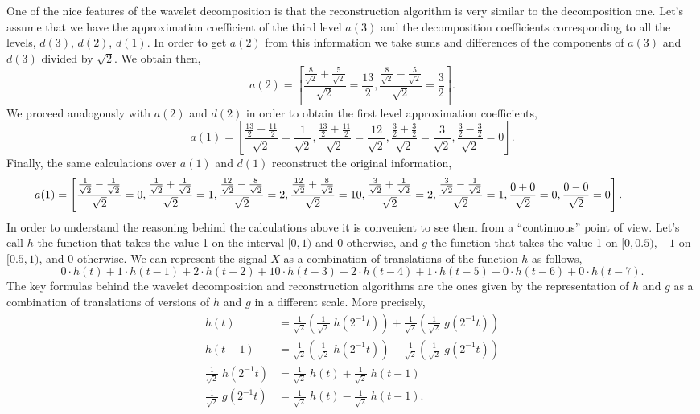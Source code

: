 One of the nice features of the wavelet decomposition is that the reconstruction algorithm is very similar to the decomposition one. Let's assume that we have the approximation coefficient of the third level $a(3)$ and the decomposition coefficients corresponding to all the levels, $d(3)$, $d(2)$, $d(1)$. In order to get $a(2)$ from this information we take sums and differences of the components of $a(3)$ and $d(3)$ divided by $\sqrt{2}$. We obtain then,
	\[
	a(2)= \left[ \dfrac{\frac{8}{\sqrt{2}} + \frac{5}{\sqrt{2}}}{\sqrt{2}}= \dfrac{13}{2}, \dfrac{\frac{8}{\sqrt{2}} - \frac{5}{\sqrt{2}}}{\sqrt{2}} = \dfrac{3}{2} \right].
	\]
We proceed analogously with $a(2)$ and $d(2)$ in order to obtain the first level approximation coefficients,
	\[
	a(1)= \left[ \dfrac{\frac{13}{2} - \frac{11}{2}}{\sqrt{2}} = \dfrac{1}{\sqrt{2}}, \dfrac{\frac{13}{2} + \frac{11}{2}}{\sqrt{2}} = \dfrac{12}{\sqrt{2}}, \dfrac{\frac{3}{2}+\frac{3}{2}}{\sqrt{2}} = \dfrac{3}{\sqrt{2}},\dfrac{\frac{3}{2} - \frac{3}{2}}{\sqrt{2}} = 0 \right].
	\]
Finally, the same calculations over $a(1)$ and $d(1)$ reconstruct the original information,
	\[
	\hspace{-1.5cm} a(1)=\left[\frac{\frac{1}{\sqrt{2}}-\frac{1}{\sqrt{2}}}{\sqrt{2}}=0,\frac{\frac{1}{\sqrt{2}}+\frac{1}{\sqrt{2}}}{\sqrt{2}}=1,\frac{\frac{12}{\sqrt{2}}-\frac{8}{\sqrt{2}}}{\sqrt{2}}=2,\frac{\frac{12}{\sqrt{2}}+\frac{8}{\sqrt{2}}}{\sqrt{2}}=10,\frac{\frac{3}{\sqrt{2}}+\frac{1}{\sqrt{2}}}{\sqrt{2}}=2,\frac{\frac{3}{\sqrt{2}}-\frac{1}{\sqrt{2}}}{\sqrt{2}}=1,\frac{0+0}{\sqrt{2}}=0,\frac{0-0}{\sqrt{2}}=0 \right].
	\]
In order to understand the reasoning behind the calculations above it is convenient to see them from a ``continuous'' point of view. Let's call $h$ the function that takes the value 1 on the interval $[0,1)$ and 0 otherwise, and $g$ the function that takes the value 1 on $[0,0.5)$, $-1$ on $[0.5,1)$, and 0 otherwise. We can represent the signal $X$ as a combination of translations of the function $h$ as follows,
	\[
	0 \cdot h(t) + 1 \cdot h(t - 1) + 2 \cdot h(t - 2) + 10 \cdot h(t - 3) + 2 \cdot h(t - 4) + 1 \cdot h(t - 5) + 0 \cdot h(t - 6)+ 0 \cdot h(t - 7).
	\]
The key formulas behind the wavelet decomposition and reconstruction algorithms are the ones given by the representation of $h$ and $g$ as a combination of translations of versions of $h$ and $g$ in a different scale. More precisely,
	\[
	\begin{split}
	h(t)&= \frac{1}{\sqrt{2}} \left( \frac{1}{\sqrt{2}} \;h(2^{-1}t) \right)+ \frac{1}{\sqrt{2}} \left( \frac{1}{\sqrt{2}} \; g(2^{-1}t) \right) \\
	h(t-1)&= \frac{1}{\sqrt{2}} \left( \frac{1}{\sqrt{2}} \; h(2^{-1}t) \right) - \frac{1}{\sqrt{2}} \left( \frac{1}{\sqrt{2}} \; g(2^{-1}t) \right) \\
	\frac{1}{\sqrt{2}}\; h(2^{-1}t)&= \frac{1}{\sqrt{2}}\; h(t)+\frac{1}{\sqrt{2}} \; h(t-1) \\
	\frac{1}{\sqrt{2}} \; g(2^{-1}t)&= \frac{1}{\sqrt{2}} \; h(t)- \frac{1}{\sqrt{2}} \; h(t-1).
	\end{split}
	\]


